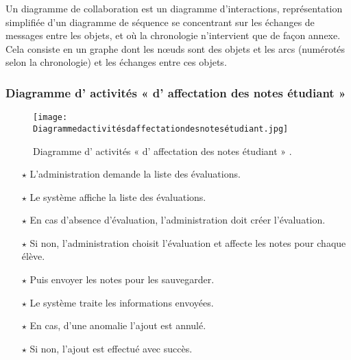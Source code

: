 
Un diagramme de collaboration est un diagramme d'interactions, représentation simplifiée d'un diagramme de séquence se concentrant sur les échanges de messages entre les objets, et où la chronologie n'intervient que de façon annexe.\\
Cela consiste en un graphe dont les nœuds sont des objets et les arcs (numérotés selon la chronologie) et les échanges entre ces objets.



\subsubsection{Diagramme d' activités « d' affectation des notes étudiant » }
\begin{figure}[ht]
	\centering
	\texttt{[image: Diagrammedactivitésdaffectationdesnotesétudiant.jpg]}
	\caption{Diagramme d' activités « d' affectation des notes étudiant » .}
	\label{fig:Diagramme d' activités  d' affectation des notes étudiant   }
\end{figure}
\FloatBarrier



	\begin{itemize}	
	
	
	
\item[$\star$] L’administration demande la liste des évaluations.
\item[$\star$] Le système affiche la liste des évaluations.
\item[$\star$] En cas d’absence d’évaluation, l’administration doit créer l’évaluation.
\item[$\star$] Si non, l’administration choisit l’évaluation et affecte les notes pour chaque élève.
\item[$\star$] Puis envoyer les notes pour les sauvegarder.
\item[$\star$] Le système traite les informations envoyées.
\item[$\star$] En cas, d’une anomalie l’ajout est annulé.
\item[$\star$] Si non, l’ajout est effectué avec succès.
	
	
	
	
\end{itemize}


